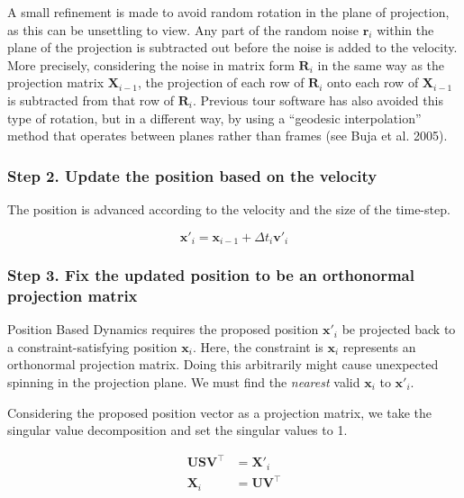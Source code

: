 A small refinement is made to avoid random rotation in the plane of projection, as this can be unsettling to view. Any part of the random noise \(\mathbf r_i\) within the plane of the projection is subtracted out before the noise is added to the velocity. More precisely, considering the noise in matrix form \(\mathbf R_i\) in the same way as the projection matrix \(\mathbf X_{i-1}\), the projection of each row of \(\mathbf R_i\) onto each row of \(\mathbf X_{i-1}\) is subtracted from that row of \(\mathbf R_i\). Previous tour software has also avoided this type of rotation, but in a different way, by using a ``geodesic interpolation'' method that operates between planes rather than frames (see Buja et al. 2005).

\hypertarget{step-2.-update-the-position-based-on-the-velocity}{%
\subsubsection{Step 2. Update the position based on the velocity}\label{step-2.-update-the-position-based-on-the-velocity}}

The position is advanced according to the velocity and the size of the time-step.

\begin{equation*}
\mathbf x'_i = \mathbf x_{i-1} + \Delta t_i \mathbf v'_i
\end{equation*}

\hypertarget{step-3.-fix-the-updated-position-to-be-an-orthonormal-projection-matrix}{%
\subsubsection{Step 3. Fix the updated position to be an orthonormal projection matrix}\label{step-3.-fix-the-updated-position-to-be-an-orthonormal-projection-matrix}}

Position Based Dynamics requires the proposed position \(\mathbf x'_i\) be projected back to a constraint-satisfying position \(\mathbf x_i\). Here, the constraint is \(\mathbf x_i\) represents an orthonormal projection matrix. Doing this arbitrarily might cause unexpected spinning in the projection plane. We must find the \emph{nearest} valid \(\mathbf x_i\) to \(\mathbf x'_i\).

Considering the proposed position vector as a projection matrix, we take the singular value decomposition and set the singular values to 1.

\begin{align}
\mathbf U \mathbf S \mathbf V^\top & = \mathbf X'_i 
    \label{eq:svd} \\
\mathbf X_i & = \mathbf U \mathbf V^\top
    \label{eq:orthonormalize}
\end{align}

